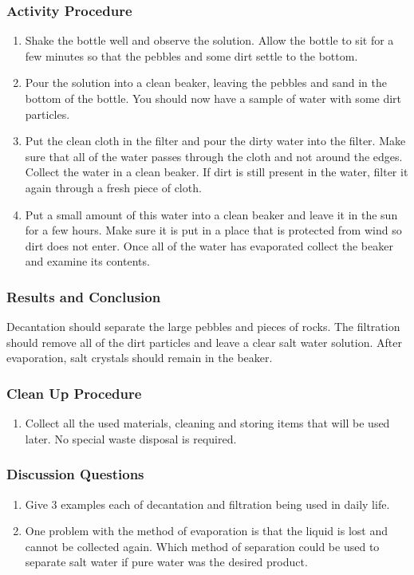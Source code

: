 \subsubsection*{Activity Procedure}
\begin{enumerate}
\item Shake the bottle well and observe the solution. Allow the bottle to sit for a few minutes so that the pebbles and some dirt settle to the bottom.
\item Pour the solution into a clean beaker, leaving the pebbles and sand in the bottom of the bottle. You should now have a sample of water with some dirt particles.
\item Put the clean cloth in the filter and pour the dirty water into the filter. Make sure that all of the water passes through the cloth and not around the edges. Collect the water in a clean beaker. If dirt is still present in the water, filter it again through a fresh piece of cloth.
\item Put a small amount of this water into a clean beaker and leave it in the sun for a few hours. Make sure it is put in a place that is protected from wind so dirt does not enter. Once all of the water has evaporated collect the beaker and examine its contents.
\end{enumerate}

\subsubsection*{Results and Conclusion}
Decantation should separate the large pebbles and pieces of rocks. The filtration should remove all of the dirt particles and leave a clear salt water solution. After evaporation, salt crystals should remain in the beaker.

\subsubsection*{Clean Up Procedure}
\begin{enumerate}
\item{Collect all the used materials, cleaning and storing items that will be used later. No special waste disposal is required.}
\end{enumerate}

\subsubsection*{Discussion Questions}
\begin{enumerate}
\item{Give 3 examples each of decantation and filtration being used in daily life.}
\item{One problem with the method of evaporation is that the liquid is lost and cannot be collected again. Which method of separation could be used to separate salt water if pure water was the desired product.}
\end{enumerate}


